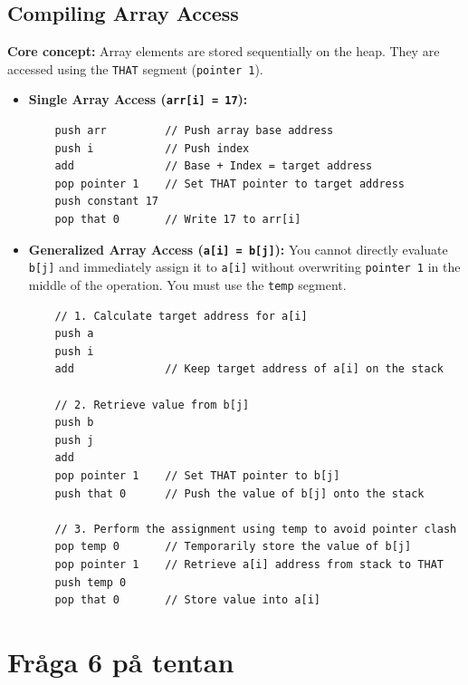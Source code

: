 \documentclass[12pt,a4paper]{article}
\begin{document}
\subsection{Compiling Array Access}
\textbf{Core concept:} Array elements are stored sequentially on the heap. They are accessed using the \texttt{THAT} segment (\texttt{pointer 1}).
\begin{itemize}
    \item \textbf{Single Array Access (\texttt{arr[i] = 17}):}
    \begin{verbatim}
    push arr         // Push array base address
    push i           // Push index
    add              // Base + Index = target address
    pop pointer 1    // Set THAT pointer to target address
    push constant 17
    pop that 0       // Write 17 to arr[i]
    \end{verbatim}
    \item \textbf{Generalized Array Access (\texttt{a[i] = b[j]}):} You cannot directly evaluate \texttt{b[j]} and immediately assign it to \texttt{a[i]} without overwriting \texttt{pointer 1} in the middle of the operation. You must use the \texttt{temp} segment.
    \begin{verbatim}
    // 1. Calculate target address for a[i]
    push a
    push i
    add              // Keep target address of a[i] on the stack
    
    // 2. Retrieve value from b[j]
    push b
    push j
    add
    pop pointer 1    // Set THAT pointer to b[j]
    push that 0      // Push the value of b[j] onto the stack
    
    // 3. Perform the assignment using temp to avoid pointer clash
    pop temp 0       // Temporarily store the value of b[j]
    pop pointer 1    // Retrieve a[i] address from stack to THAT
    push temp 0
    pop that 0       // Store value into a[i]
    \end{verbatim}
\end{itemize}

\newpage
\section{Fråga 6 på tentan}
\end{document}
